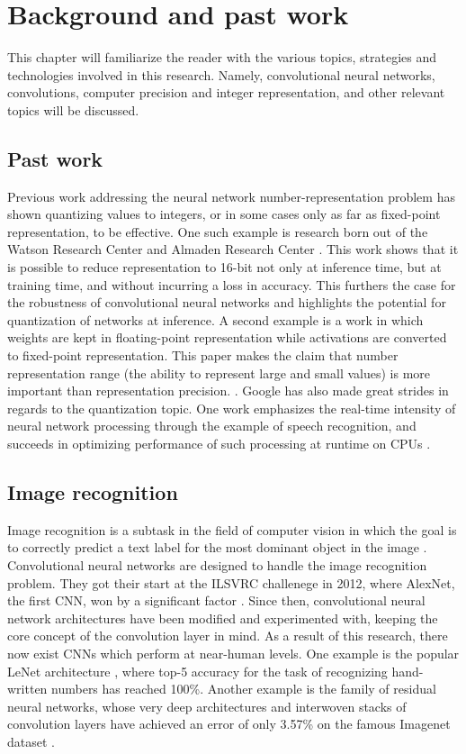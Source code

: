\chapter{Background and past work}

This chapter will familiarize the reader with the various topics, strategies and technologies involved in this research. Namely, convolutional neural networks, convolutions, computer precision and integer representation, and other relevant topics will be discussed.

\section{Past work}
Previous work addressing the neural network number-representation problem has shown quantizing values to integers, or in some cases only as far as fixed-point representation, to be effective. One such example is research born out of the Watson Research Center and Almaden Research Center \cite{gupta}. This work shows that it is possible to reduce representation to 16-bit not only at inference time, but at training time, and without incurring a loss in accuracy. This furthers the case for the robustness of convolutional neural networks and highlights the potential for quantization of networks at inference. A second example is a work in which weights are kept in floating-point representation while activations are converted to fixed-point representation. This paper makes the claim that number representation range (the ability to represent large and small values) is more important than representation precision. \cite{dblp}. Google has also made great strides in regards to the quantization topic. One work emphasizes the real-time intensity of neural network processing through the example of speech recognition, and succeeds in optimizing performance of such processing at runtime on CPUs \cite{google}.

\section{Image recognition}
Image recognition is a subtask in the field of computer vision in which the goal is to correctly predict a text label for the most dominant object in the image \cite{history}. Convolutional neural networks are designed to handle the image recognition problem. They got their start at the ILSVRC challenege in 2012, where AlexNet, the first CNN, won by a significant factor \cite{history}. Since then, convolutional neural network architectures have been modified and experimented with, keeping the core concept of the convolution layer in mind. As a result of this research, there now exist CNNs which perform at near-human levels. One example is the popular LeNet architecture \cite{mnist}, where top-5 accuracy for the task of recognizing hand-written numbers has reached 100\%. Another example is the family of residual neural networks, whose very deep architectures and interwoven stacks of convolution layers have achieved an error of only 3.57\% on the famous Imagenet dataset \cite{resnets2}.

